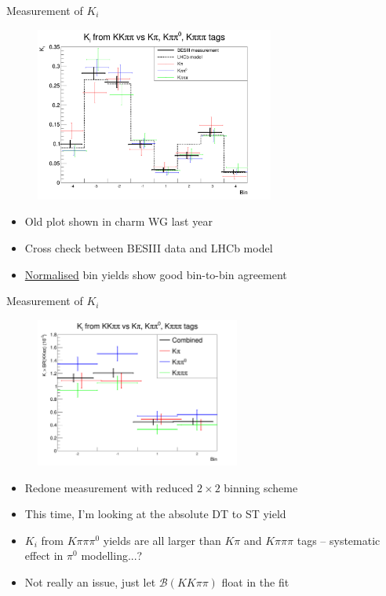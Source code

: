 \documentclass{beamer}
\begin{document}
\begin{frame}{Measurement of \texorpdfstring{$K_i$}{Ki}}
  \begin{figure}
    \centering
    \includegraphics[width = 0.7\textwidth]{Plots/Ki_Measured_vs_Model_normalised.png}
  \end{figure}
  \vspace{-0.6cm}
  \begin{itemize}
    \item{Old plot shown in charm WG last year}
    \item{Cross check between BESIII data and LHCb model}
    \item{\underline{Normalised} bin yields show good bin-to-bin agreement}
  \end{itemize}
\end{frame}

\begin{frame}{Measurement of \texorpdfstring{$K_i$}{Ki}}
  \begin{figure}
    \centering
    \includegraphics[width = 0.6\textwidth]{Plots/Ki_Measured_vs_Model.png}
  \end{figure}
  \vspace{-0.6cm}
  \begin{itemize}
    \item{Redone measurement with reduced $2\times2$ binning scheme}
    \item{This time, I'm looking at the absolute DT to ST yield}
    \item{$K_i$ from $K\pi\pi\pi^0$ yields are all larger than $K\pi$ and $K\pi\pi\pi$ tags -- systematic effect in $\pi^0$ modelling...?}
    \item{Not really an issue, just let $\mathcal{B}(KK\pi\pi)$ float in the fit}
  \end{itemize}
\end{frame}
\end{document}

